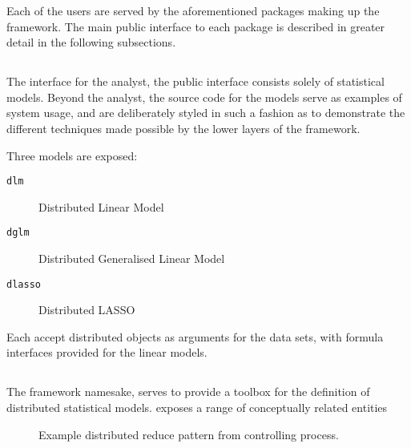 \documentclass[letterpaper, inpress]{jds} %
\begin{document}
Each of the users are served by the aforementioned packages making up the framework.
The main public interface to each package is described in greater detail in the following subsections. 

\subsection{}

The interface for the analyst, the  public interface consists solely of statistical models.
Beyond the analyst, the source code for the models serve as examples of system usage, and are deliberately styled in such a fashion as to demonstrate the different techniques made possible by the lower layers of the  framework.

Three models are exposed:
\begin{description}
    \item[\texttt{dlm}] Distributed Linear Model
    \item[\texttt{dglm}] Distributed Generalised Linear Model
    \item[\texttt{dlasso}] Distributed LASSO
\end{description}

Each accept distributed objects as arguments for the data sets, with formula interfaces provided for the linear models.


\subsection{}

The framework namesake,  serves to provide a toolbox for the definition of distributed statistical models.
 exposes a range of conceptually related entities

\todo{Distributed Object and methods - [, table, etc.}

\begin{figure}[ht]
\begin{center}
    
\caption{Example distributed reduce pattern from controlling process.}
\label{fig:dreduce}
\end{center}
\end{figure}
\end{document}
